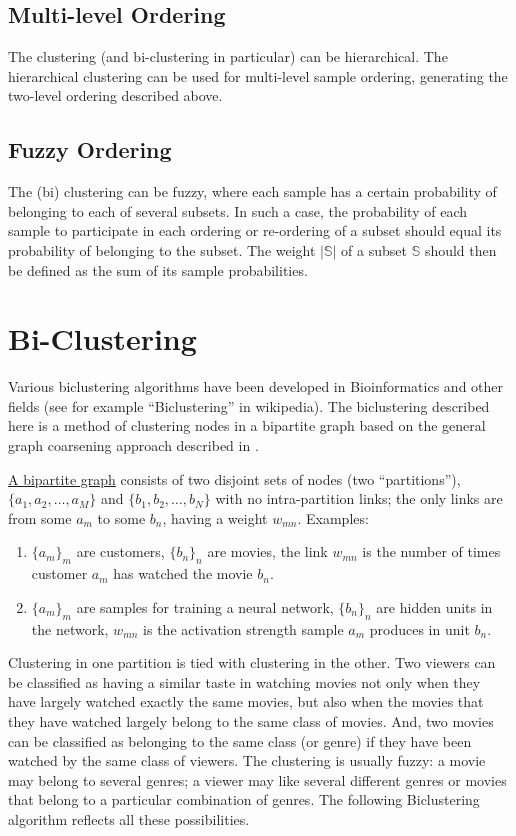 \documentclass{article} %
\begin{document}
\subsection{Multi-level Ordering}
The clustering (and bi-clustering in particular) can be hierarchical. The hierarchical clustering can be used for multi-level sample ordering, generating the two-level ordering described above. 

\subsection{Fuzzy Ordering}
The (bi) clustering can be fuzzy, where each sample has a certain probability of belonging to each of several subsets. In such a case, the probability of each sample to participate in each ordering or re-ordering of a subset should equal its probability of belonging to the subset. The weight $|\mathbb{S}|$ of a subset $\mathbb{S}$ should then be defined as the sum of its sample probabilities. 


\section{Bi-Clustering}
\label{sec:bi-clustering}
Various biclustering algorithms have been developed in Bioinformatics and other fields (see for example ``Biclustering'' in wikipedia). The biclustering described here is a method of clustering nodes in a bipartite graph based on the general graph coarsening approach described in \cite{RSB}. 

\underline{A bipartite graph} consists of two disjoint sets of nodes (two ``partitions''), $\{a_1,a_2,\ldots,a_M\}$ and 
$\{b_1,b_2,\ldots,b_N\}$ with no intra-partition links; the only links are from some $a_m$ to some $b_n$, having a weight $w_{mn}$. Examples:
\begin{enumerate}
\item
$\{a_m\}_m$ are customers, $\{b_n\}_n$ are movies, the link $w_{mn}$ is the number of times customer $a_m$ has watched the movie $b_n$.
\item 
$\{a_m\}_m$ are samples for training a neural network, $\{b_n\}_n$ are  hidden units in the network, $w_{mn}$ is the activation strength sample $a_m$ produces in unit $b_n$.
\end{enumerate}

Clustering in one partition is tied with clustering in the other. Two viewers can be classified as having a similar taste in watching movies not only when they have largely watched exactly the same movies, but also when the movies that they have watched largely belong to the same class of movies. And, two movies can be classified as belonging to the same class (or genre) if they have been watched by the same class of viewers. The clustering is usually fuzzy: a movie may belong to several genres; a viewer may like several different genres or movies that belong to a particular combination of genres. The following Biclustering algorithm reflects all these possibilities. 
\end{document}
